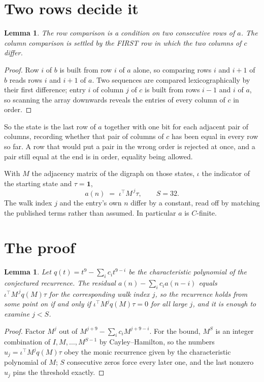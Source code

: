 \documentclass[11pt,a4paper]{article}
\theoremstyle{plain}
\newtheorem{lemma}[theorem]{Lemma}
\theoremstyle{definition}
\begin{document}
\section{Two rows decide it}

\begin{lemma}\label{lem:win}
The row comparison is a condition on two consecutive rows of $a$. The column comparison is
settled by the FIRST row in which the two columns of $c$ differ.
\end{lemma}

\begin{proof}
Row $i$ of $b$ is built from row $i$ of $a$ alone, so comparing rows $i$ and $i+1$ of $b$ reads
rows $i$ and $i+1$ of $a$. Two sequences are compared lexicographically by their first
difference; entry $i$ of column $j$ of $c$ is built from rows $i-1$ and $i$ of $a$, so scanning
the array downwards reveals the entries of every column of $c$ in order.
\end{proof}

So the state is the last row of $a$ together with one bit for each adjacent pair of columns,
recording whether that pair of columns of $c$ has been equal in every row so far. A row that
would put a pair in the wrong order is rejected at once, and a pair still equal at the end is
in order, equality being allowed.

With $M$ the adjacency matrix of the digraph on those states, $\iota$ the indicator of the
starting state and $\tau=\mathbf{1}$,
\[
a(n)\;=\;\iota^{\!\top}M^{\,j}\tau ,\qquad S=32.
\]
The walk index $j$ and the entry's own $n$ differ by a constant, read off by matching the
published terms rather than assumed. In particular $a$ is $C$-finite.

\section{The proof}

\begin{lemma}\label{lem:crit}
Let $q(t)=t^{9}-\sum_i c_it^{9-i}$ be the characteristic polynomial of the
conjectured recurrence. The residual $a(n)-\sum_ic_ia(n-i)$ equals
$\iota^{\!\top}M^{\,j}q(M)\tau$ for the corresponding walk index $j$, so the recurrence
holds from some point on if and only if $\iota^{\!\top}M^{j}q(M)\tau=0$ for all large $j$,
and it is enough to examine $j<S$.
\end{lemma}

\begin{proof}
Factor $M^{j}$ out of $M^{j+9}-\sum_ic_iM^{j+9-i}$. For the bound, $M^{S}$
is an integer combination of $I,M,\dots,M^{S-1}$ by Cayley--Hamilton, so the numbers
$u_j=\iota^{\!\top}M^{j}q(M)\tau$ obey the monic recurrence given by the characteristic
polynomial of $M$; $S$ consecutive zeros force every later one, and the last nonzero $u_j$
pins the threshold exactly.
\end{proof}
\end{document}
